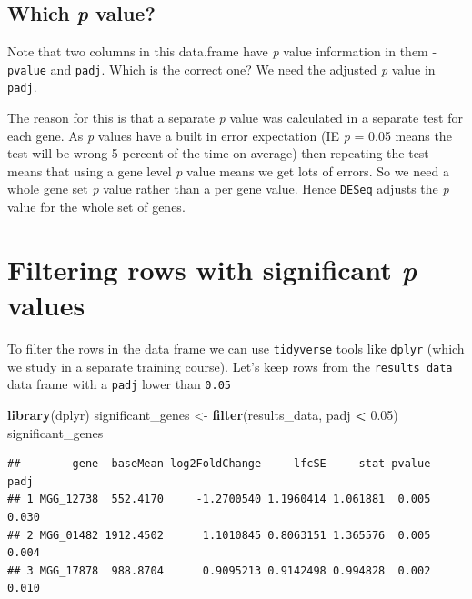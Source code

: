 \documentclass[]{book}
\newenvironment{Shaded}{\begin{snugshade}}{\end{snugshade}}
\newcommand{\FloatTok}[1]{\textcolor[rgb]{0.00,0.00,0.81}{#1}}
\newcommand{\KeywordTok}[1]{\textcolor[rgb]{0.13,0.29,0.53}{\textbf{#1}}}
\newcommand{\NormalTok}[1]{#1}
\newcommand{\OperatorTok}[1]{\textcolor[rgb]{0.81,0.36,0.00}{\textbf{#1}}}
\newcommand{\StringTok}[1]{\textcolor[rgb]{0.31,0.60,0.02}{#1}}
\begin{document}
\hypertarget{which-p-value}{%
\subsection{\texorpdfstring{Which \emph{p} value?}{Which p value?}}\label{which-p-value}}

Note that two columns in this data.frame have \emph{p} value information in them - \texttt{pvalue} and \texttt{padj}. Which is the correct one? We need the adjusted \emph{p} value in \texttt{padj}.

The reason for this is that a separate \emph{p} value was calculated in a separate test for each gene. As \emph{p} values have a built in error expectation (IE \emph{p} = 0.05 means the test will be wrong 5 percent of the time on average) then repeating the test means that using a gene level \emph{p} value means we get lots of errors. So we need a whole gene set \emph{p} value rather than a per gene value. Hence \texttt{DESeq} adjusts the \emph{p} value for the whole set of genes.

\hypertarget{filtering-rows-with-significant-p-values}{%
\section{\texorpdfstring{Filtering rows with significant \emph{p} values}{Filtering rows with significant p values}}\label{filtering-rows-with-significant-p-values}}

To filter the rows in the data frame we can use \texttt{tidyverse} tools like \texttt{dplyr} (which we study in a separate training course). Let's keep rows from the \texttt{results\_data} data frame with a \texttt{padj} lower than \texttt{0.05}

\begin{Shaded}
\begin{Highlighting}[]
\KeywordTok{library}\NormalTok{(dplyr)}
\NormalTok{significant_genes <-}\StringTok{ }\KeywordTok{filter}\NormalTok{(results_data, padj }\OperatorTok{<}\StringTok{ }\FloatTok{0.05}\NormalTok{)}
\NormalTok{significant_genes}
\end{Highlighting}
\end{Shaded}

\begin{verbatim}
##        gene  baseMean log2FoldChange     lfcSE     stat pvalue  padj
## 1 MGG_12738  552.4170     -1.2700540 1.1960414 1.061881  0.005 0.030
## 2 MGG_01482 1912.4502      1.1010845 0.8063151 1.365576  0.005 0.004
## 3 MGG_17878  988.8704      0.9095213 0.9142498 0.994828  0.002 0.010
\end{verbatim}
\end{document}
